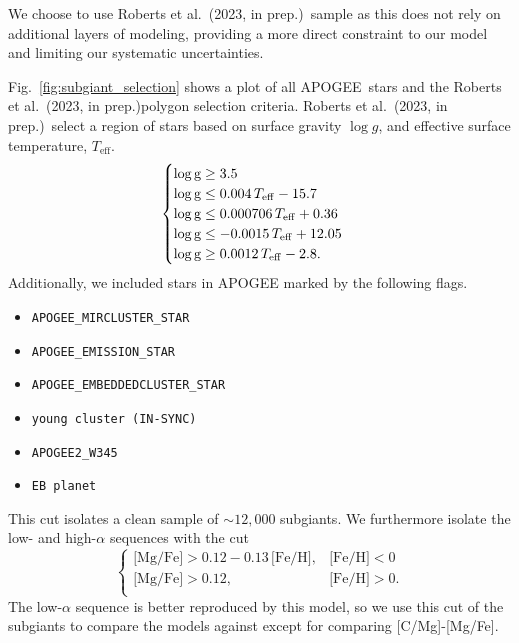 \documentclass[fleqn,usenatbib]{mnras}
\newcommand{\citetjack}{Roberts et al.~(2023, in prep.)}
\newcommand{\apogee}{APOGEE}
\newcommand{\caafe}{[C/Mg]-[Mg/Fe]}
\newcommand{\about}[1]{${\sim} #1$}
\begin{document}
We choose to use \citetjack\ sample as this does not rely on additional layers of modeling, providing a more direct constraint to our model and limiting our systematic uncertainties.



Fig.~\ref{fig:subgiant_selection} shows a plot of all \apogee\ stars and the \citetjack polygon selection criteria. 
 \citetjack~select a region of stars based on surface gravity $\log g$, and effective surface temperature, $T_\text{eff}$.
 \begin{equation}
    \begin{cases} \label{eq:subgiant_selection}
        \log \text{g} \geq 3.5 \\
        \log \text{g} \leq 0.004\,T_{\rm eff} - 15.7 \\
        \log \text{g} \leq 0.000706\,T_{\rm eff} + 0.36 \\
        \log \text{g} \leq -0.0015\,T_{\rm eff} + 12.05 \\
        \log \text{g} \geq 0.0012\,T_{\rm eff} - 2.8. \\
    \end{cases}
\end{equation}
Additionally, we included stars in \apogee{} marked by the following flags.
\begin{itemize}
\item \verb|APOGEE_MIRCLUSTER_STAR|
\item \verb|APOGEE_EMISSION_STAR|
\item \verb|APOGEE_EMBEDDEDCLUSTER_STAR|
\item \verb|young cluster (IN-SYNC)|
\item \verb|APOGEE2_W345|
\item \verb|EB planet|
\end{itemize}
This cut isolates a clean sample of \about{12,000} subgiants.
We furthermore isolate the low- and high-$\alpha$ sequences with the cut
\begin{equation}\label{eq:high_alpha}
\begin{cases}
\text{[Mg/Fe]} >0.12-0.13\,\text{[Fe/H]}, & \text{[Fe/H]}<0\\
\text{[Mg/Fe]} >0.12, & \text{[Fe/H]}>0. \\
\end{cases}
\end{equation}
The low-$\alpha$ sequence is better reproduced by this model, so we use this cut of the subgiants to compare the models against except for comparing \caafe. 
\end{document}
